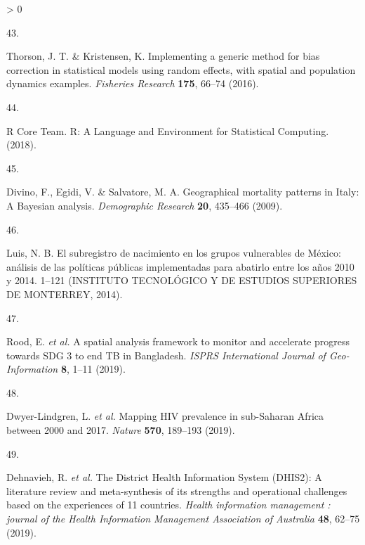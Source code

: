 \documentclass[
]{article}
\newlength{\cslhangindent}
\newlength{\csllabelwidth}
\newenvironment{CSLReferences}[2] %
 {%
  \setlength{\parindent}{0pt}
  \ifodd #1 \everypar{\setlength{\hangindent}{\cslhangindent}}\ignorespaces\fi
  \ifnum #2 > 0
  \setlength{\parskip}{#2\baselineskip}
  \fi
 }%
 {}
\newcommand{\CSLLeftMargin}[1]{\parbox[t]{\csllabelwidth}{#1}}
\newcommand{\CSLRightInline}[1]{\parbox[t]{\linewidth - \csllabelwidth}{#1}\break}
\begin{document}
\begin{CSLReferences}{0}{0}
\leavevmode\hypertarget{ref-Thorson2016}{}%
\CSLLeftMargin{43. }
\CSLRightInline{Thorson, J. T. \& Kristensen, K. {Implementing a generic method for bias correction in statistical models using random effects, with spatial and population dynamics examples}. \emph{Fisheries Research} \textbf{175}, 66--74 (2016).}

\leavevmode\hypertarget{ref-RCoreTeam2018}{}%
\CSLLeftMargin{44. }
\CSLRightInline{R Core Team. {R: A Language and Environment for Statistical Computing}. (2018).}

\leavevmode\hypertarget{ref-Divino2009}{}%
\CSLLeftMargin{45. }
\CSLRightInline{Divino, F., Egidi, V. \& Salvatore, M. A. {Geographical mortality patterns in Italy: A Bayesian analysis}. \emph{Demographic Research} \textbf{20}, 435--466 (2009).}

\leavevmode\hypertarget{ref-Luis2014}{}%
\CSLLeftMargin{46. }
\CSLRightInline{Luis, N. B. {El subregistro de nacimiento en los grupos vulnerables de M{é}xico: an{á}lisis de las pol{í}ticas p{ú}blicas implementadas para abatirlo entre los a{ñ}os 2010 y 2014}. 1--121 (INSTITUTO TECNOL{Ó}GICO Y DE ESTUDIOS SUPERIORES DE MONTERREY, 2014).}

\leavevmode\hypertarget{ref-Rood2019}{}%
\CSLLeftMargin{47. }
\CSLRightInline{Rood, E. \emph{et al.} {A spatial analysis framework to monitor and accelerate progress towards SDG 3 to end TB in Bangladesh}. \emph{ISPRS International Journal of Geo-Information} \textbf{8}, 1--11 (2019).}

\leavevmode\hypertarget{ref-Dwyer-Lindgren2019}{}%
\CSLLeftMargin{48. }
\CSLRightInline{Dwyer-Lindgren, L. \emph{et al.} {Mapping HIV prevalence in sub-Saharan Africa between 2000 and 2017}. \emph{Nature} \textbf{570}, 189--193 (2019).}

\leavevmode\hypertarget{ref-Dehnavieh2019}{}%
\CSLLeftMargin{49. }
\CSLRightInline{Dehnavieh, R. \emph{et al.} {The District Health Information System (DHIS2): A literature review and meta-synthesis of its strengths and operational challenges based on the experiences of 11 countries}. \emph{Health information management : journal of the Health Information Management Association of Australia} \textbf{48}, 62--75 (2019).}

\end{CSLReferences}
\end{document}
